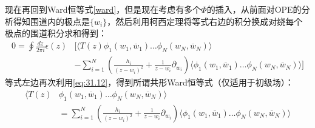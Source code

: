 现在再回到Ward恒等式\ref{ward}，但是现在考虑有多个$\Phi$的插入，从前面对OPE的分析得知围道内的极点是$\{w_i\}$，然后利用柯西定理将等式右边的积分换成对绕每个极点的围道积分求和得到：
\begin{equation}
	\begin{aligned}0=\oint\frac{dz}{2\pi i}\epsilon(z)&\Bigg[\Big\langle T(z)\phi_1(w_1,\overline{w}_1)\ldots\phi_N(w_N,\overline{w}_N)\Big\rangle\\
		&-\sum_{i=1}^N\left(\frac{h_i}{(z-w_i)^2}+\frac{1}{z-w_i}\partial_{w_i}\right)\Big\langle\phi_1(w_1,\overline{w}_1)\ldots\phi_N(w_N,\overline{w}_N)\Big\rangle\Bigg]\end{aligned}
\end{equation}
等式左边再次利用\ref{eq:31.12}，得到所谓共形Ward恒等式（仅适用于初级场）：
\begin{equation}
	\boxed{\begin{aligned}\big\langle T\left(z\right)&\phi_{1}(w_{1},\overline{w}_{1})\ldots\phi_{N}(w_{N},\overline{w}_{N})\big\rangle\\&=\sum_{i=1}^{N}\left(\frac{h_{i}}{(z-w_{i})^{2}}+\frac{1}{z-w_{i}}\partial_{w_{i}}\right)\Big\langle\phi_{1}(w_{1},\overline{w}_{1})\ldots\phi_{N}(w_{N},\overline{w}_{N})\Big\rangle\end{aligned}}
\end{equation}
